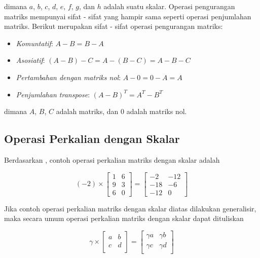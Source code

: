 \noindent
dimana $a$, $b$, $c$, $d$, $e$, $f$, $g$, dan $h$ adalah suatu skalar. Operasi
pengurangan matriks mempunyai sifat - sifat yang hampir sama seperti operasi
penjumlahan matriks. Berikut merupakan sifat - sifat operasi pengurangan matriks:

\begin{itemize}
  \label{property_substraction_matrix}

  \item \emph{Komuntatif}: $A - B = B - A$

  \item \emph{Asosiatif}: $(A - B) - C = A - (B - C) = A - B - C$

  \item \emph{Pertambahan dengan matriks nol}: $A - 0 = 0 - A = A$

  \item \emph{Penjumlahan transpose}: $(A - B)^{T}= A^{T}- B^{T}$
\end{itemize}

\noindent
dimana $A$, $B$, $C$ adalah matriks, dan $0$ adalah matriks nol.

\subsection{Operasi Perkalian dengan Skalar}

Berdasarkan \cite{boydIntroductionAppliedLinear2018}, contoh operasi perkalian matriks
dengan skalar adalah

\[
  (-2) \times
  \begin{bmatrix}
    1 & 6 \\
    9 & 3 \\
    6 & 0
  \end{bmatrix}
  =
  \begin{bmatrix}
    -2  & -12 \\
    -18 & -6  \\
    -12 & 0
  \end{bmatrix}
\]

\noindent
Jika contoh operasi perkalian matriks dengan skalar diatas dilakukan generalisir,
maka secara umum operasi perkalian matriks dengan skalar dapat dituliskan

\begin{equation}
  \label{eq:matrix_mult_scalar}\gamma \times
  \begin{bmatrix}
    a & b \\
    c & d \\
  \end{bmatrix}
  =
  \begin{bmatrix}
    \gamma a & \gamma b \\
    \gamma c & \gamma d \\
  \end{bmatrix}
\end{equation}

